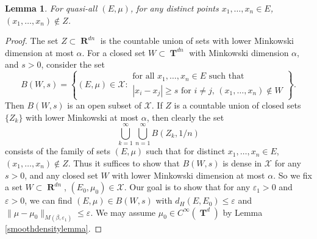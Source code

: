 \documentclass[12pt,reqno]{article}
\numberwithin{equation}{section}
\DeclareMathOperator{\RR}{\mathbf{R}}
\DeclareMathOperator{\TT}{\mathbf{T}}
\newtheorem{lemma}[theorem]{Lemma}
\begin{document}
\begin{lemma}
    For quasi-all $(E,\mu)$, for any distinct points $x_1, \dots, x_n \in E$, $(x_1, \dots, x_n) \not \in Z$.
\end{lemma}
\begin{proof}
    The set $Z \subset \RR^{dn}$ is the countable union of sets with lower Minkowski dimension at most $\alpha$. For a closed set $W \subset \TT^{dn}$ with Minkowski dimension $\alpha$, and $s > 0$, consider the set
    \[ B(W,s) = \left\{ (E,\mu) \in \mathcal{X}: \begin{array}{c}
            \text{for all $x_1, \dots, x_n \in E$ such that}\\
            \text{$|x_i - x_j| \geq s$ for $i \neq j$, $(x_1, \dots, x_n) \not \in W$}
        \end{array} \right\}. \]
    Then $B(W,s)$ is an open subset of $\mathcal{X}$. If $Z$ is a countable union of closed sets $\{ Z_k \}$ with lower Minkowski at most $\alpha$, then clearly the set
    \[ \bigcup_{k = 1}^\infty \bigcup_{n = 1}^\infty B(Z_k,1/n) \]
    consists of the family of sets $(E,\mu)$ such that for distinct $x_1, \dots, x_n \in E$, $(x_1, \dots, x_n) \not \in Z$. Thus it suffices to show that $B(W,s)$ is dense in $\mathcal{X}$ for any $s > 0$, and any closed set $W$ with lower Minkowski dimension at most $\alpha$. So we fix a set $W \subset \RR^{dn}$, $(E_0,\mu_0) \in \mathcal{X}$. Our goal is to show that for any $\varepsilon_1 > 0$ and $\varepsilon > 0$, we can find $(E,\mu) \in B(W,s)$ with $d_H(E,E_0) \leq \varepsilon$ and $\| \mu - \mu_0 \|_{M(\beta,\varepsilon_1)} \leq \varepsilon$. We may assume $\mu_0 \in C^\infty(\TT^d)$ by Lemma \ref{smoothdensitylemma}.


\end{proof}
\end{document}

